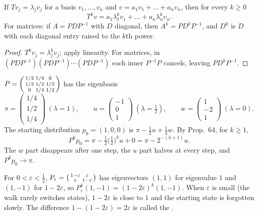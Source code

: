 \documentclass[10pt]{scrartcl}
\begin{document}
\begin{proposition*}
  If $Tv_j=\lambda_jv_j$ for a basis $v_1,\dots,v_n$ and $v=a_1v_1+\dots+a_nv_n$, then for every $k\ge0$
  \[ T^kv=a_1\lambda_1^kv_1+\dots+a_n\lambda_n^kv_n. \]
  For matrices: if $A=PDP^{-1}$ with $D$ diagonal, then $A^k=PD^kP^{-1}$, and $D^k$ is $D$ with each diagonal entry raised to the $k$th power.
\end{proposition*}
\begin{proof}
  $T^kv_j=\lambda_j^kv_j$; apply linearity. For matrices, in $(PDP^{-1})(PDP^{-1})\cdots(PDP^{-1})$ each inner $P^{-1}P$ cancels, leaving $PD^kP^{-1}$.
\end{proof}

\begin{example*}
  $P=\begin{psmallmatrix}1/2&1/4&0\\1/2&1/2&1/2\\0&1/4&1/2\end{psmallmatrix}$ has the eigenbasis
  \[ \pi=\begin{pmatrix}1/4\\1/2\\1/4\end{pmatrix}\ (\lambda=1),\qquad u=\begin{pmatrix}-1\\0\\1\end{pmatrix}\ (\lambda=\tfrac12),\qquad w=\begin{pmatrix}1\\-2\\1\end{pmatrix}\ (\lambda=0). \]
  The starting distribution $p_0=(1,0,0)$ is $\pi-\tfrac12u+\tfrac14w$. By Prop.~64, for $k\ge1$,
  \[ P^kp_0=\pi-\tfrac12\big(\tfrac12\big)^ku+0=\pi-2^{-(k+1)}u. \]
  The $w$ part disappears after one step, the $u$ part halves at every step, and $P^kp_0\to\pi$.
\end{example*}

\begin{example*}
  For $0<\varepsilon<\tfrac12$, $P_\varepsilon=\begin{psmallmatrix}1-\varepsilon&\varepsilon\\\varepsilon&1-\varepsilon\end{psmallmatrix}$ has eigenvectors $(1,1)$ for eigenvalue $1$ and $(1,-1)$ for $1-2\varepsilon$, so $P_\varepsilon^k(1,-1)=(1-2\varepsilon)^k(1,-1)$. When $\varepsilon$ is small (the walk rarely switches states), $1-2\varepsilon$ is close to $1$ and the starting state is forgotten slowly. The difference $1-(1-2\varepsilon)=2\varepsilon$ is called the .
\end{example*}
\end{document}
